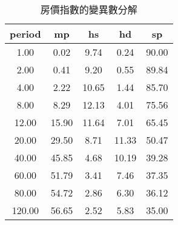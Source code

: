 \begin{table}[h]
\centering
\begin{tabular}{ccccc}
  \hline
period & mp & hs & hd & sp \\ 
  \hline
1.00 & 0.02 & 9.74 & 0.24 & 90.00 \\ 
   \hline
2.00 & 0.41 & 9.20 & 0.55 & 89.84 \\ 
   \hline
4.00 & 2.22 & 10.65 & 1.44 & 85.70 \\ 
   \hline
8.00 & 8.29 & 12.13 & 4.01 & 75.56 \\ 
   \hline
12.00 & 15.90 & 11.64 & 7.01 & 65.45 \\ 
   \hline
20.00 & 29.50 & 8.71 & 11.33 & 50.47 \\ 
   \hline
40.00 & 45.85 & 4.68 & 10.19 & 39.28 \\ 
   \hline
60.00 & 51.79 & 3.41 & 7.46 & 37.35 \\ 
   \hline
80.00 & 54.72 & 2.86 & 6.30 & 36.12 \\ 
   \hline
120.00 & 56.65 & 2.52 & 5.83 & 35.00 \\ 
   \hline
\end{tabular}
\caption{房價指數的變異數分解} 
\end{table}
